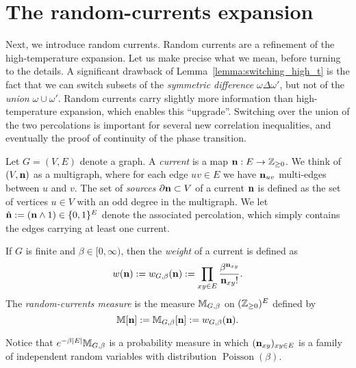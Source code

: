 \section{The random-currents expansion}

Next, we introduce random currents.
Random currents are a refinement of the high-temperature expansion.
Let us make precise what we mean, before turning to the details.
A significant drawback of Lemma~\ref{lemma:switching_high_t}
is the fact that we can switch subsets of the \emph{symmetric difference}
$\omega\Delta\omega'$, but not of the \emph{union} $\omega\cup\omega'$.
Random currents carry slightly more information than high-temperature expansion,
which enables this ``upgrade''.
Switching over the union of the two percolations is important for several
new correlation inequalities, and eventually the proof of continuity of the phase transition.

\begin{definition}[Currents]
    Let $G=(V,E)$ denote a graph.
    A \emph{current} is a map $\mathbf{n}:E\to\mathbb Z_{\geq 0}$.
    We think of $(V,\mathbf{n})$ as a multigraph,
    where for each edge $uv\in E$ we have $\mathbf{n}_{uv}$ multi-edges between $u$ and $v$.
    The set of \emph{sources} $\partial\mathbf{n}\subset V$ of a current
    $\mathbf{n}$ is defined as the set of vertices $u\in V$ with an odd degree in the multigraph.
    We let $\hat{\mathbf{n}}:=(\mathbf{n}\wedge 1)\in\{0,1\}^E$ denote the associated percolation,
    which simply contains the edges carrying at least one current.

    If $G$ is finite and $\beta\in[0,\infty)$, then the
    \emph{weight} of a current is defined as
    \[
        w(\mathbf{n}):=w_{G,\beta}(\mathbf{n}):=\prod_{xy\in E}
        \frac{\beta^{\mathbf{n}_{xy}}}{\mathbf{n}_{xy}!}.
    \]
    The \emph{random-currents measure} is the measure $\mathbb M_{G,\beta}$ on $(\mathbb Z_{\geq 0})^E$
    defined by
    \[
        \mathbb M[\mathbf{n}]:=\mathbb M_{G,\beta}[\mathbf{n}]:=w_{G,\beta}(\mathbf{n}).
    \]
\end{definition}

\begin{remark}
    Notice that $e^{-\beta|E|}\mathbb M_{G,\beta}$ is a probability measure
    in which $(\mathbf{n}_{xy})_{xy\in E}$ is a family of independent
    random variables with distribution $\operatorname{Poisson}(\beta)$.
\end{remark}

